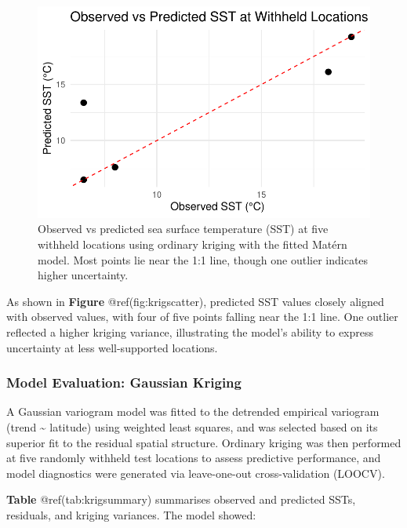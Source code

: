 \documentclass[
  11pt,
]{article}
\begin{document}
\begin{figure}[H]

{\centering \includegraphics{project_files/figure-pdf/fig-krigscatter-1.pdf}

}

\caption{Observed vs predicted sea surface temperature (SST) at five
withheld locations using ordinary kriging with the fitted Matérn model.
Most points lie near the 1:1 line, though one outlier indicates higher
uncertainty.}

\end{figure}%

As shown in \textbf{Figure} @ref(fig:krigscatter), predicted SST values
closely aligned with observed values, with four of five points falling
near the 1:1 line. One outlier reflected a higher kriging variance,
illustrating the model's ability to express uncertainty at less
well-supported locations.

\subsubsection{Model Evaluation: Gaussian
Kriging}\label{model-evaluation-gaussian-kriging}

A Gaussian variogram model was fitted to the detrended empirical
variogram (trend \textasciitilde{} latitude) using weighted least
squares, and was selected based on its superior fit to the residual
spatial structure. Ordinary kriging was then performed at five randomly
withheld test locations to assess predictive performance, and model
diagnostics were generated via leave-one-out cross-validation (LOOCV).

\textbf{Table} @ref(tab:krigsummary) summarises observed and predicted
SSTs, residuals, and kriging variances. The model showed:
\end{document}
